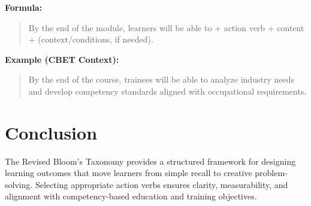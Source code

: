 \documentclass[12pt]{article}
\begin{document}
\textbf{Formula:}

\begin{quote}
By the end of the module, learners will be able to + action verb + content + (context/conditions, if needed).
\end{quote}

\textbf{Example (CBET Context):}

\begin{quote}
By the end of the course, trainees will be able to analyze industry needs and develop competency standards aligned with occupational requirements.
\end{quote}

\section{Conclusion}

The Revised Bloom's Taxonomy provides a structured framework for designing learning outcomes that move learners from simple recall to creative problem-solving. Selecting appropriate action verbs ensures clarity, measurability, and alignment with competency-based education and training objectives.
\end{document}
